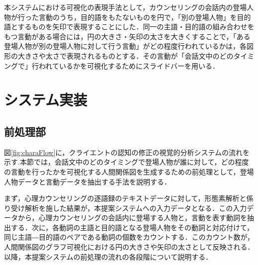 \documentclass[shuuron]{kuee}
\begin{document}
本システムにおける可視化の表現手法として，カウンセリングの会話内の登場人物が行った言動のうち，目的語をもたないものを円で，「別の登場人物」を目的語とするものを矢印で表現することにした．同一の主語・目的語の組み合わせをもつ言動がある場合には，円の大きさ・矢印の太さを大きくすることで，「ある登場人物が別の登場人物に対して行う言動」がどの程度行われているかは，各図形の大きさや太さで表現されるものとする．その言動が「会話文中のどのタイミングで」行われているかを可視化するためにスライドバーを用いる．







\section{システム実装} %

\subsection{前処理部} %


図\ref{fig:charaFlow}に，クライエントの認知の修正の視覚的分析システムの流れを示す.本節では，会話文中のどのタイミングで登場人物が誰に対して，どの程度の言動を行ったかを可視化する人間関係図を生成するための前処理として，登場人物データと言動データを抽出する手法を説明する．%

まず，心理カウンセリングの逐語録のテキストデータに対して，形態素解析と係り受け解析を施した結果が，本提案システムへの入力データとなる．この入力データから，心理カウンセリングの会話内に登場する人物と，言動を表す動詞を抽出する．次に，各動詞の主語と目的語となる登場人物をその動詞と対応付けて，同じ主語―目的語のペアである動詞の個数をカウントする．このカウント数が，人間関係図のグラフ可視化における円の大きさや矢印の太さとして反映される．以降，本提案システムの前処理の流れの各段階について説明する．
\end{document}
